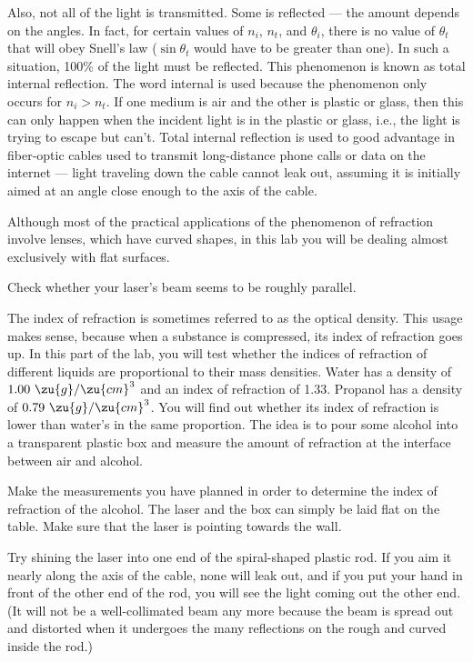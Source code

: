 Also, not all of the light is transmitted. Some is reflected
--- the amount depends on the angles. In fact, for certain
values of $n_i$, $n_t$, and $\theta_i$, there is no value of
$\theta_t$ that will obey Snell's law ($\sin\theta_t$ would
have to be greater than one). In such a situation, 100\% of
the light must be reflected. This phenomenon is known as
total internal reflection. The word internal is used because
the phenomenon only occurs for $n_i>n_t$. If one medium is
air and the other is plastic or glass, then this can only
happen when the incident light is in the plastic or glass,
i.e., the light is trying to escape but can't. Total internal
reflection is used to good advantage in fiber-optic cables
used to transmit long-distance phone calls or data on the
internet --- light traveling down the cable cannot leak out,
assuming it is initially aimed at an angle close enough to
the axis of the cable.

Although most of the practical applications of the
phenomenon of refraction involve lenses, which have curved
shapes, in this lab you will be dealing almost exclusively with flat surfaces.


Check whether your laser's beam seems to be roughly parallel.

\observations


The index of refraction is sometimes referred to as the
optical density. This usage makes sense, because when a substance
is compressed, its index of refraction goes up. In this part
of the lab, you will test whether the indices of refraction of
different liquids are proportional to their mass densities.
Water has a density of $1.00\ \zu{g}/\zu{cm}^3$ and an index
of refraction of 1.33. Propanol has a density of $0.79\ \zu{g}/\zu{cm}^3$.
You will find out whether its index of refraction is lower than water's in the same proportion.
The idea is to pour some alcohol into a transparent plastic box and measure
the amount of refraction at the interface between air and alcohol.

Make the measurements you have planned in order to determine
the index of refraction of the alcohol. The laser and the box can
simply be laid flat on the table. Make sure that the laser
is pointing towards the wall.



Try shining the laser into one end of the spiral-shaped
plastic rod. If you aim it nearly along the axis of the
cable, none will leak out, and if you put your hand in front
of the other end of the rod, you will see the light coming
out the other end. (It will not be a well-collimated beam
any more because the beam is spread out and distorted when
it undergoes the many reflections on the rough and
curved inside the rod.)

